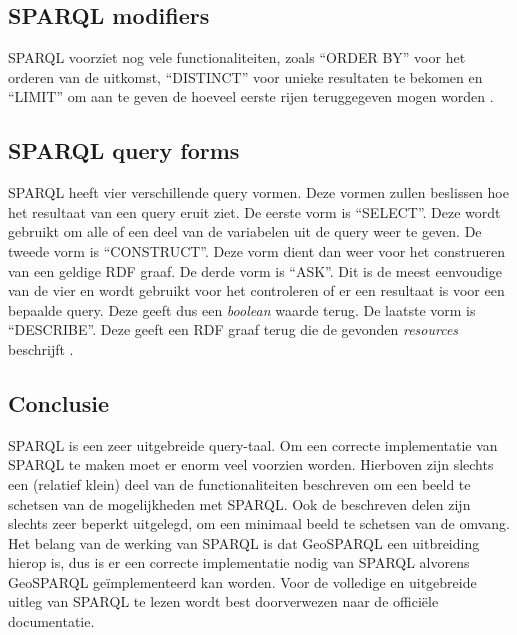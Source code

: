 \subsection{SPARQL modifiers}
SPARQL voorziet nog vele functionaliteiten, zoals ``ORDER BY'' voor het orderen van de uitkomst, ``DISTINCT'' voor unieke resultaten te bekomen en ``LIMIT'' om aan te geven de hoeveel eerste rijen teruggegeven mogen worden \cite{sparql2013querylanguage}.


\subsection{SPARQL query forms}
SPARQL heeft vier verschillende query vormen. Deze vormen zullen beslissen hoe het resultaat van een query eruit ziet. De eerste vorm is ``SELECT''. Deze wordt gebruikt om alle of een deel van de variabelen uit de query weer te geven. De tweede vorm is ``CONSTRUCT''. Deze vorm dient dan weer voor het construeren van een geldige RDF graaf. De derde vorm is ``ASK''. Dit is de meest eenvoudige van de vier en wordt gebruikt voor het controleren of er een resultaat is voor een bepaalde query. Deze geeft dus een \textit{boolean} waarde terug. De laatste vorm is ``DESCRIBE''. Deze geeft een RDF graaf terug die de gevonden \textit{resources} beschrijft \cite{sparql2013querylanguage}.


\subsection{Conclusie}
SPARQL is een zeer uitgebreide query-taal. Om een correcte implementatie van SPARQL te maken moet er enorm veel voorzien worden. Hierboven zijn slechts een (relatief klein) deel van de functionaliteiten beschreven om een beeld te schetsen van de mogelijkheden met SPARQL. Ook de beschreven delen zijn slechts zeer beperkt uitgelegd, om een minimaal beeld te schetsen van de omvang. Het belang van de werking van SPARQL is dat GeoSPARQL een uitbreiding hierop is, dus is er een correcte implementatie nodig van SPARQL alvorens GeoSPARQL geïmplementeerd kan worden. Voor de volledige en uitgebreide uitleg van SPARQL te lezen wordt best doorverwezen naar de officiële documentatie.